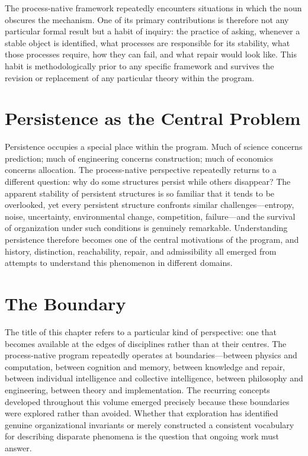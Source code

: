 \documentclass[11pt, oneside]{book}
\theoremstyle{definition}
\theoremstyle{remark}
\begin{document}
The process-native framework repeatedly encounters situations in which the noun obscures the mechanism. One of its primary contributions is therefore not any particular formal result but a habit of inquiry: the practice of asking, whenever a stable object is identified, what processes are responsible for its stability, what those processes require, how they can fail, and what repair would look like. This habit is methodologically prior to any specific framework and survives the revision or replacement of any particular theory within the program.

\section{Persistence as the Central Problem}

Persistence occupies a special place within the program. Much of science concerns prediction; much of engineering concerns construction; much of economics concerns allocation. The process-native perspective repeatedly returns to a different question: why do some structures persist while others disappear? The apparent stability of persistent structures is so familiar that it tends to be overlooked, yet every persistent structure confronts similar challenges—entropy, noise, uncertainty, environmental change, competition, failure—and the survival of organization under such conditions is genuinely remarkable. Understanding persistence therefore becomes one of the central motivations of the program, and history, distinction, reachability, repair, and admissibility all emerged from attempts to understand this phenomenon in different domains.

\section{The Boundary}

The title of this chapter refers to a particular kind of perspective: one that becomes available at the edges of disciplines rather than at their centres. The process-native program repeatedly operates at boundaries—between physics and computation, between cognition and memory, between knowledge and repair, between individual intelligence and collective intelligence, between philosophy and engineering, between theory and implementation. The recurring concepts developed throughout this volume emerged precisely because these boundaries were explored rather than avoided. Whether that exploration has identified genuine organizational invariants or merely constructed a consistent vocabulary for describing disparate phenomena is the question that ongoing work must answer.
\end{document}
